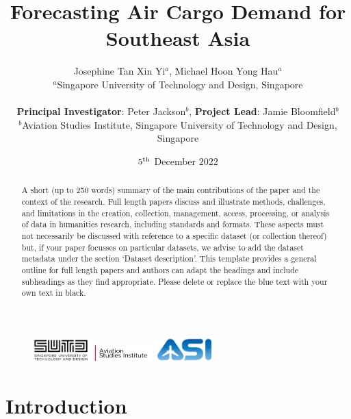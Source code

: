 \documentclass{article}
\title{Forecasting Air Cargo Demand for Southeast Asia}
\author{Josephine Tan Xin Yi$^{a}$, Michael Hoon Yong Hau$^{a}$\\
        \small $^{a}$Singapore University of Technology and Design, Singapore \\\\
        \small \textbf{Principal Investigator}: Peter Jackson$^{b}$, \textbf{Project Lead}: Jamie Bloomfield$^{b}$ \\
        \small $^{b}$Aviation Studies Institute, Singapore University of Technology and Design, Singapore \\
}
\date{$5\textsuperscript{th}$ December $2022$} %
\begin{document}
\maketitle

\begin{figure}[t!]
    \centering
    \includegraphics[width=0.2\textwidth]{images/ASI Graphics/sutd-asi-logo-web-2021-fc.png}
    \includegraphics[width=0.2\textwidth]{images/ASI Graphics/asi-logo-web-2022-fc.png}
    \includegraphics[width=0.2\textwidth]{images/ASI Graphics/asi-logo-web-2021-fc-02-v2.png}
    \label{titlefig}
\end{figure}

\begin{abstract} 
\noindent A short (up to 250 words) summary of the main contributions of the paper and the context of the research. Full length papers discuss and illustrate methods, challenges, and limitations in the creation, collection, management, access, processing, or analysis of data in humanities research, including standards and formats. These aspects must not necessarily be discussed with reference to a specific dataset (or collection thereof) but, if your paper focusses on particular datasets, we advise to add the dataset metadata under the section ‘Dataset description’. This template provides a general outline for full length papers and authors can adapt the headings and include subheadings as they find appropriate. Please delete or replace the blue text with your own text in black.  
\end{abstract}

\noindent{}

\newpage

\tableofcontents

\newpage

\section{Introduction}
\end{document}
